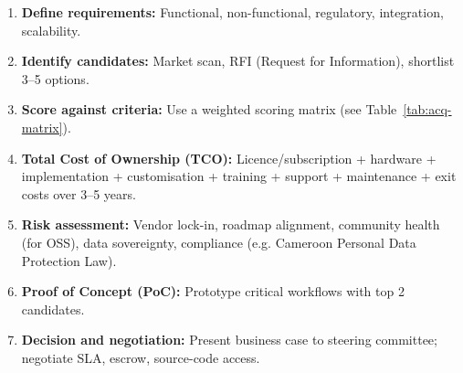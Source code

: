 \documentclass[11pt]{article}
\begin{document}
\begin{methode}
\begin{enumerate}
\item \textbf{Define requirements:} Functional, non-functional, regulatory, integration, scalability.
\item \textbf{Identify candidates:} Market scan, RFI (Request for Information), shortlist 3--5 options.
\item \textbf{Score against criteria:} Use a weighted scoring matrix (see Table~\ref{tab:acq-matrix}).
\item \textbf{Total Cost of Ownership (TCO):} Licence/subscription + hardware + implementation + customisation + training + support + maintenance + exit costs over 3--5 years.
\item \textbf{Risk assessment:} Vendor lock-in, roadmap alignment, community health (for OSS), data sovereignty, compliance (e.g. Cameroon Personal Data Protection Law).
\item \textbf{Proof of Concept (PoC):} Prototype critical workflows with top 2 candidates.
\item \textbf{Decision and negotiation:} Present business case to steering committee; negotiate SLA, escrow, source-code access.
\end{enumerate}
\end{methode}
\end{document}
